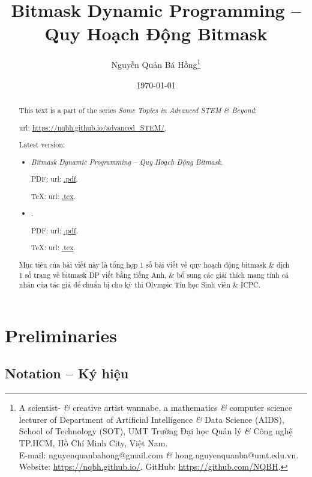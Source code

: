 \documentclass{article}
\title{Bitmask Dynamic Programming -- Quy Hoạch Động Bitmask}
\author{Nguyễn Quản Bá Hồng\footnote{A scientist- {\it\&} creative artist wannabe, a mathematics {\it\&} computer science lecturer of Department of Artificial Intelligence {\it\&} Data Science (AIDS), School of Technology (SOT), UMT Trường Đại học Quản lý {\it\&} Công nghệ TP.HCM, Hồ Chí Minh City, Việt Nam.\\E-mail: {\sf nguyenquanbahong@gmail.com} {\it\&} {\sf hong.nguyenquanba@umt.edu.vn}. Website: \url{https://nqbh.github.io/}. GitHub: \url{https://github.com/NQBH}.}}
\date{\today}
\begin{document}
 \maketitle
\begin{abstract}
    This text is a part of the series {\it Some Topics in Advanced STEM \& Beyond}:

    {\sc url}: \url{https://nqbh.github.io/advanced_STEM/}.

    Latest version:
    \begin{itemize}
        \item {\it Bitmask Dynamic Programming -- Quy Hoạch Động Bitmask}.

        PDF: {\sc url}: \url{.pdf}.

        \TeX: {\sc url}: \url{.tex}.
        \item {\it }.

        PDF: {\sc url}: \url{.pdf}.

        \TeX: {\sc url}: \url{.tex}.
    \end{itemize}
    Mục tiêu của bài viết này là tổng hợp 1 số bài viết về quy hoạch động bitmask \& dịch 1 số trang về bitmask DP viết bằng tiếng Anh, \& bổ sung các giải thích mang tính cá nhân của tác giả để chuẩn bị cho kỳ thi Olympic Tin học Sinh viên \& ICPC.
\end{abstract}
\tableofcontents


\section{Preliminaries}


\subsection{Notation -- Ký hiệu}
\end{document}
